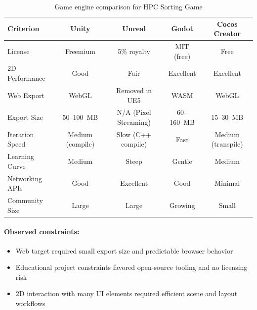 \begin{table}[htbp]
    \centering
    \footnotesize
    \setlength{\tabcolsep}{4pt} %
    \caption{Game engine comparison for HPC Sorting Game}
    \label{tab:engine-comparison}
    \begin{tabular}{@{}lcccc@{}}
        \toprule
        \textbf{Criterion} & \textbf{Unity}   & \textbf{Unreal}       & \textbf{Godot} & \textbf{Cocos Creator} \\
        \midrule
        License            & Freemium         & 5\% royalty           & MIT (free)     & Free                   \\
        2D Performance     & Good             & Fair                  & Excellent      & Excellent              \\
        Web Export         & WebGL            & Removed in UE5        & WASM           & WebGL                  \\
        Export Size        & 50--100~MB       & N/A (Pixel Streaming) & 60--160~MB     & 15--30~MB              \\
        Iteration Speed    & Medium (compile) & Slow (C++ compile)    & Fast           & Medium (transpile)     \\
        Learning Curve     & Medium           & Steep                 & Gentle         & Medium                 \\
        Networking APIs    & Good             & Excellent             & Good           & Minimal                \\
        Community Size     & Large            & Large                 & Growing        & Small                  \\
        \bottomrule
    \end{tabular}
\end{table}



\paragraph*{Observed constraints:}
\begin{itemize}
    \item Web target required small export size and predictable browser behavior
    \item Educational project constraints favored open-source tooling and no licensing risk
    \item 2D interaction with many UI elements required efficient scene and layout workflows
\end{itemize}

